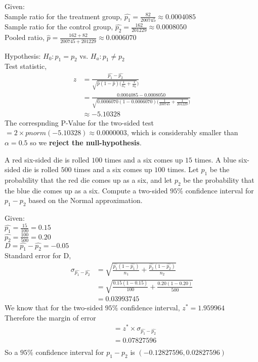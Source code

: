 \documentclass[boxes, qed]{homework}
\begin{document}
\begin{problem}
  Given:\\
  Sample ratio for the treatment group, $\hat{p_1}=\frac{82}{200745} \approx 0.0004085$\\
  Sample ratio for the control group, $\hat{p_2}=\frac{162}{201229} \approx 0.0008050$\\
  Pooled ratio, $\hat{p}=\frac{162+82}{200745+201229} \approx 0.0006070$
\end{problem}
\begin{solution}
  Hypothesis: $H_0:p_1=p_2$ vs. $H_a:p_1\ne p_2$\\
  Test statistic, 
  \begin{align*}
    z&=\frac{\hat{p_1}-\hat{p_2}}{\sqrt{\hat{p}(1- \hat{p})(\frac{1}{n_1}+\frac{1}{n_2}})}\\
    &=\frac{0.0004085-0.0008050}{\sqrt{0.0006070(1- 0.0006070)(\frac{1}{200745}+\frac{1}{201229}})}\\
    &\approx -5.10328
  \end{align*}
  The correspnding P-Value for the two-sided test
  $=2\times pnorm(-5.10328) \approx 0.0000003$, 
  which is considerably smaller  than $\alpha=0.5$ so we \textbf{reject the null-hypothesis}.
\end{solution}

\begin{problem}A red six-sided die is rolled $100$ times and a six comes up $15$ times. 
  A blue six-sided die is rolled $500$ times and a six comes up $100$ times. 
  Let $p_1$ be the probability that the red die comes up as a six, and let $p_2$ 
  be the probability that the blue die comes up as a six. Compute a two-sided $95\%$ 
  confidence interval for $p_1-p_2$ based on the Normal approximation.
\end{problem}
\begin{solution}Given:\\
  $\hat{p_1}=\frac{15}{100}=0.15$\\
  $\hat{p_2}=\frac{100}{500}=0.20$\\
  $D=\hat{p_1}-\hat{p_2}=-0.05$\\
  Standard error for D,
  \begin{align*}
    \sigma_{\hat{p_1}-\hat{p_2}}
      &=\sqrt{\frac{\hat{p_1}(1-\hat{p_1})}{n_1} + \frac{\hat{p_2}(1-\hat{p_2})}{n_2}}\\
      &=\sqrt{\frac{0.15(1-0.15)}{100} + \frac{0.20(1-0.20)}{500}}\\
      &=0.03993745
  \end{align*}
  We know that for the two-sided $95\%$ confidence interval, 
  $z^*=1.959964$\\
  Therefore the margin of error 
  \begin{align*}
    &=z^* \times \sigma_{\hat{p_1}-\hat{p_2}}\\
    &=0.07827596\\
  \end{align*}
  So a $95\%$ confidence interval for $p_1-p_2$
  is $(-0.12827596, 0.02827596)$
\end{solution}
\end{document}
